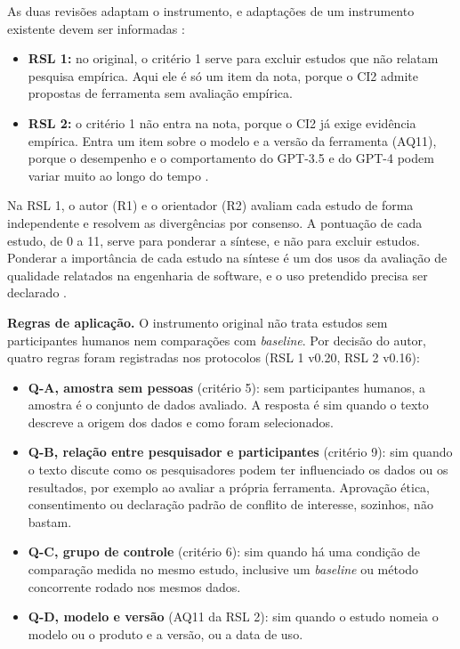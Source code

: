As duas revisões adaptam o instrumento, e adaptações de um instrumento
existente devem ser informadas \cite[item 11]{page2021ee}:

\begin{itemize}
	\item \textbf{RSL 1:} no original, o critério 1 serve para excluir estudos
	que não relatam pesquisa empírica. Aqui ele é só um item da nota, porque o
	CI2 admite propostas de ferramenta sem avaliação empírica.
	\item \textbf{RSL 2:} o critério 1 não entra na nota, porque o CI2 já
	exige evidência empírica. Entra um item sobre o modelo e a versão da
	ferramenta (AQ11), porque o desempenho e o comportamento do GPT-3.5 e do
	GPT-4 podem variar muito ao longo do tempo \cite{chen2024}.
\end{itemize}

Na RSL 1, o autor (R1) e o orientador (R2) avaliam cada estudo de forma independente e resolvem as
divergências por consenso. A pontuação de cada estudo, de 0 a 11, serve para
ponderar a síntese, e não para excluir estudos. Ponderar a importância de cada
estudo na síntese é um dos usos da avaliação de qualidade relatados na
engenharia de software, e o uso pretendido precisa ser declarado
\cite[seção 2.3 e tabela 2]{kitchenham2023segress}.

\textbf{Regras de aplicação.} O instrumento original não trata estudos sem
participantes humanos nem comparações com \textit{baseline}. Por decisão do
autor, quatro regras foram registradas nos protocolos (RSL 1 v0.20, RSL 2
v0.16):
\begin{itemize}
	\item \textbf{Q-A, amostra sem pessoas} (critério 5): sem participantes
	humanos, a amostra é o conjunto de dados avaliado. A resposta é sim quando
	o texto descreve a origem dos dados e como foram selecionados.
	\item \textbf{Q-B, relação entre pesquisador e participantes} (critério 9):
	sim quando o texto discute como os pesquisadores podem ter influenciado os
	dados ou os resultados, por exemplo ao avaliar a própria ferramenta.
	Aprovação ética, consentimento ou declaração padrão de conflito de
	interesse, sozinhos, não bastam.
	\item \textbf{Q-C, grupo de controle} (critério 6): sim quando há uma
	condição de comparação medida no mesmo estudo, inclusive um
	\textit{baseline} ou método concorrente rodado nos mesmos dados.
	\item \textbf{Q-D, modelo e versão} (AQ11 da RSL 2): sim quando o estudo
	nomeia o modelo ou o produto e a versão, ou a data de uso.
\end{itemize}

